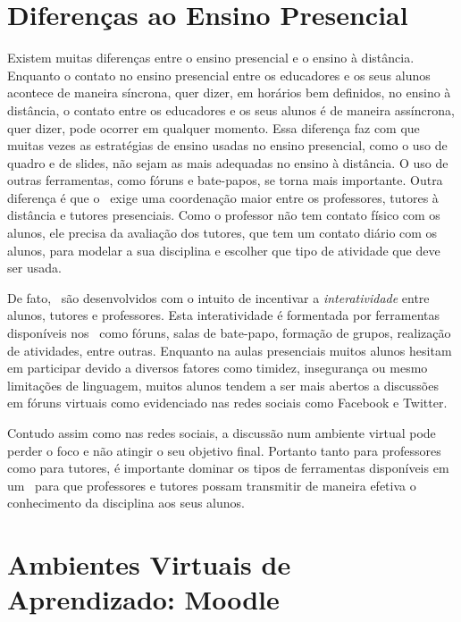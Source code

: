 
\section{Diferenças ao Ensino Presencial}  Existem muitas diferenças entre o ensino presencial e 
o ensino à distância. Enquanto o contato no ensino presencial entre os educadores e os seus alunos acontece de maneira síncrona, 
quer dizer, em horários bem definidos, no ensino à distância, o contato entre os educadores e os seus alunos é de maneira
assíncrona, quer dizer, pode ocorrer em qualquer momento. Essa diferença faz com que muitas vezes as estratégias de ensino usadas no ensino 
presencial, como o uso de quadro e de slides, não sejam as mais adequadas no ensino à distância. O uso de outras ferramentas, 
como fóruns e bate-papos, se torna mais importante. Outra diferença é que o \ead\ exige uma coordenação maior entre os professores, tutores
à distância e tutores presenciais. Como o professor não tem contato físico com os alunos, ele precisa da avaliação dos tutores, 
que tem um contato diário com os alunos, para modelar a sua disciplina e escolher que tipo de atividade que deve ser usada.

De fato, \avas\ são desenvolvidos com o intuito de incentivar 
a \emph{interatividade} entre alunos, tutores e professores. Esta interatividade é formentada por ferramentas 
disponíveis nos \avas\ como fóruns, salas de bate-papo, formação de grupos, realização de atividades, entre outras. 
Enquanto na aulas presenciais muitos alunos hesitam em participar devido a diversos fatores como timidez, insegurança ou 
mesmo limitações de linguagem, muitos alunos tendem a ser mais abertos a discussões em 
fóruns virtuais como evidenciado nas redes sociais como Facebook e Twitter. 

Contudo assim como nas redes sociais, a discussão num ambiente virtual pode perder o foco e não atingir 
o seu objetivo final. Portanto tanto para professores como para tutores, é importante dominar os 
tipos de ferramentas disponíveis em um \ava\ para que professores e tutores possam transmitir 
de maneira efetiva o conhecimento da disciplina aos seus alunos.


\section{Ambientes Virtuais de Aprendizado: Moodle}
\label{subsec:cap1:Moodle}

